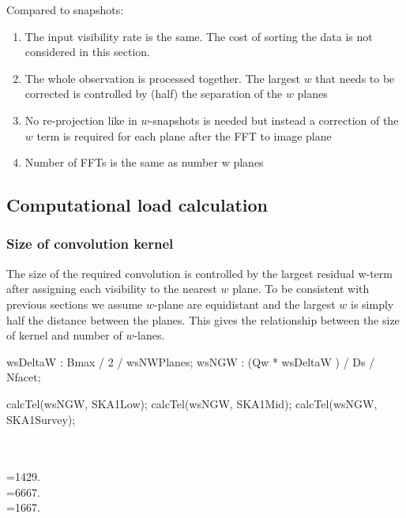 \documentclass[useAMS,usenatbib,referee]{article}
\begin{document}
Compared to snapshots:
\begin{enumerate}
  \item The input visibility rate is the same. The cost of sorting the
    data is not considered in this section.
  \item The whole observation is processed together. The largest $w$
    that needs to be corrected is controlled by (half) the separation
    of the $w$ planes
  \item No re-projection like in $w$-snapshots is needed but instead a
    correction of the $w$ term is required for each plane after the
    FFT to image plane
  \item Number of FFTs is the same as number w planes
\end{enumerate}

\subsection{Computational load calculation}


\subsubsection{Size of convolution kernel}

The size of the required convolution is controlled by the largest
residual w-term after assigning each visibility to the nearest $w$
plane. To be consistent with previous sections we assume $w$-plane are
equidistant and the largest $w$ is simply half the distance between
the planes.  This gives the relationship between the size of kernel
and number of $w$-lanes.

\begin{maxima}[]
wsDeltaW : Bmax / 2 / wsNWPlanes;
wsNGW :  (Qw * wsDeltaW ) / Ds / Nfacet;

calcTel(wsNGW, SKA1Low);
calcTel(wsNGW, SKA1Mid);
calcTel(wsNGW, SKA1Survey);

\maximaoutput*
{} \\
 \\
\m  {}={{1429.}} \\
\m  {}={{6667.}} \\
\m  {}={{1667.}} \\
\end{maxima}
\end{document}
